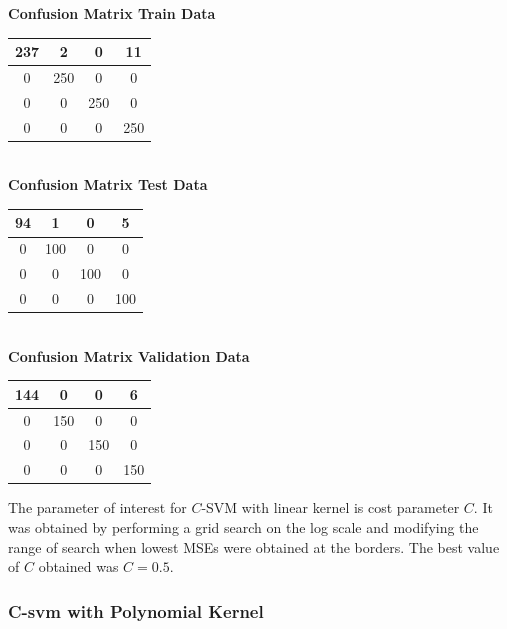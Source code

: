 \documentclass{article}
\begin{document}
\begin{flushleft}
\textbf{Confusion Matrix Train Data\\[5pt]}
\begin{tabular}{|c|c|c|c|}
\hline
237 & 2 & 0 & 11 \\
\hline
0 & 250 & 0 & 0 \\
\hline
0 & 0 & 250 & 0 \\
\hline
0 & 0 & 0 & 250 \\
\hline
\end{tabular}
\textbf{\\[10pt] Confusion Matrix Test Data \\[5pt]}
\begin{tabular}{|c|c|c|c|}
\hline
94 & 1 & 0 & 5 \\
\hline
0 & 100 & 0 & 0 \\
\hline
0 & 0 & 100 & 0 \\
\hline
0 & 0 & 0 & 100 \\
\hline
\end{tabular}
\textbf{\\[10pt] Confusion Matrix Validation Data \\[5pt]}
\begin{tabular}{|c|c|c|c|}
\hline
144 & 0 & 0 & 6 \\
\hline
0 & 150 & 0 & 0 \\
\hline
0 & 0 & 150 & 0 \\
\hline
0 & 0 & 0 & 150 \\
\hline
\end{tabular}
\end{flushleft}


The parameter of interest for $C$-SVM with linear kernel is cost parameter $C$. It was obtained by performing a grid search on the log scale and modifying the range of search when lowest MSEs were obtained at the borders.
The best value of $C$ obtained was $C=0.5$. 

\newpage
\subsubsection{C-svm with Polynomial Kernel}
\end{document}
